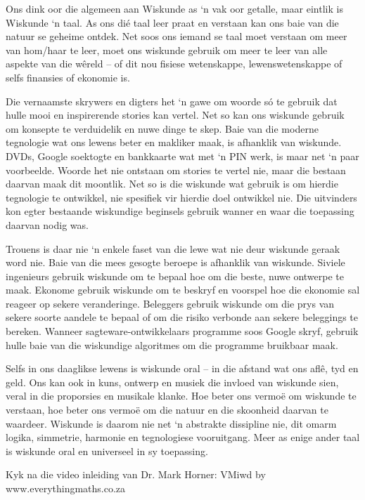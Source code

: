 {
Ons dink oor die algemeen aan Wiskunde as ‘n vak oor getalle, maar eintlik is Wiskunde ‘n taal. As ons dié taal leer praat en verstaan kan ons baie van die natuur se geheime ontdek. Net soos ons iemand se taal moet verstaan om meer van hom/haar te leer, moet ons wiskunde gebruik om meer te leer van alle aspekte van die wêreld – of dit nou fisiese wetenskappe, lewenswetenskappe of selfs finansies of ekonomie is. \par

Die vernaamste skrywers en digters het ‘n gawe om woorde só te gebruik dat hulle mooi en inspirerende stories kan vertel. Net so kan ons wiskunde gebruik om konsepte te verduidelik en nuwe dinge te skep. Baie van die moderne tegnologie wat ons lewens beter en makliker maak, is afhanklik van wiskunde. DVDs, Google soektogte en bankkaarte wat met ‘n PIN werk, is maar net ‘n paar voorbeelde. Woorde het nie ontstaan om stories te vertel nie, maar die bestaan daarvan maak dit moontlik. Net so is die wiskunde wat gebruik is om hierdie tegnologie te ontwikkel, nie spesifiek vir hierdie doel ontwikkel nie. Die uitvinders kon egter bestaande wiskundige beginsels gebruik wanner en waar die toepassing daarvan nodig was. \par


Trouens is daar nie ‘n enkele faset van die lewe wat nie deur wiskunde geraak word nie. Baie van die mees gesogte beroepe is afhanklik van wiskunde. Siviele ingenieurs gebruik wiskunde om te bepaal hoe om die beste, nuwe ontwerpe te maak. Ekonome gebruik wiskunde om te beskryf en voorspel hoe die ekonomie sal reageer op sekere veranderinge. Beleggers gebruik wiskunde om die prys van sekere soorte aandele te bepaal of om die risiko verbonde aan sekere beleggings te bereken. Wanneer sagteware-ontwikkelaars programme soos Google skryf, gebruik hulle baie van die wiskundige algoritmes om die programme bruikbaar maak.\par

Selfs in ons daaglikse lewens is wiskunde oral – in die afstand wat ons aflê, tyd en geld. Ons kan ook in kuns, ontwerp en musiek die invloed van wiskunde sien, veral in die proporsies en musikale klanke. Hoe beter ons vermoë om wiskunde te verstaan, hoe beter ons vermoë om die natuur en die skoonheid daarvan te waardeer. Wiskunde is daarom nie net ‘n abstrakte dissipline nie, dit omarm logika, simmetrie, harmonie en tegnologiese vooruitgang. Meer as enige ander taal is wiskunde oral en universeel in sy toepassing. \par

Kyk na die video inleiding van Dr. Mark Horner:  VMiwd by www.everythingmaths.co.za

}






